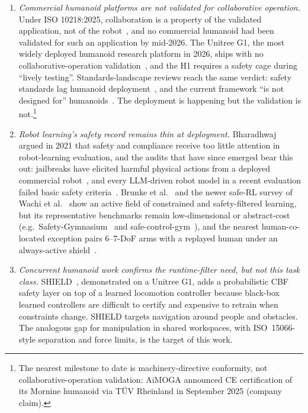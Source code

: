 \documentclass[11pt,a4paper]{report}
\newcommand{\iso}{ISO~15066}
\begin{document}
\begin{enumerate}[topsep=2pt,itemsep=2pt]
\item \emph{Commercial humanoid platforms are not validated for
  collaborative operation.} Under ISO 10218:2025, collaboration is a
  property of the validated application, not of the
  robot~\cite{hartmann2026iso}, and no commercial humanoid had been
  validated for such an application by mid-2026. The Unitree G1, the
  most widely deployed humanoid research platform in 2026, ships
  with no collaborative-operation validation~\cite{unitree_g1}, and
  the H1 requires a safety cage during ``lively testing''.
  Standards-landscape reviews reach the same verdict: safety
  standards lag humanoid deployment~\cite{koczi2025humanoidsafety},
  and the current framework ``is not designed for''
  humanoids~\cite{ieee2025pathway}. The deployment is happening but
  the validation is not.\footnote{The nearest milestone to date is
  machinery-directive conformity, not collaborative-operation
  validation: AiMOGA announced CE certification of its Mornine
  humanoid via T\"UV Rheinland in September 2025 (company claim).}
\item \emph{Robot learning's safety record remains thin at deployment.}
  Bharadhwaj~\cite{auditing2021} argued in 2021 that safety and
  compliance receive too little attention in robot-learning
  evaluation, and the audits that have since emerged bear this out:
  jailbreaks have elicited harmful physical actions from a deployed
  commercial robot~\cite{robey2025jailbreaking}, and every
  LLM-driven robot model in a recent evaluation failed basic safety
  criteria~\cite{hundt2025llmrobots}. Brunke et
  al.~\cite{brunke2022safelearning} and the newer safe-RL survey of
  Wachi et al.~\cite{wachi2024constraint} show an active field of
  constrained and safety-filtered learning, but its representative
  benchmarks remain low-dimensional or abstract-cost
  (e.g.\ Safety-Gymnasium~\cite{ji2023safetygymnasium} and
  safe-control-gym~\cite{yuan2022safecontrolgym}), and the nearest
  human-co-located exception pairs 6--7-DoF arms with a replayed
  human under an always-active shield~\cite{thumm2024humanrobotgym}.
\item \emph{Concurrent humanoid work confirms the runtime-filter need,
  but not this task class.} SHIELD~\cite{shield2025}, demonstrated on
  a Unitree G1, adds a probabilistic CBF safety layer on top of a
  learned locomotion controller because black-box learned controllers
  are difficult to certify and expensive to retrain when constraints
  change. SHIELD targets navigation around people and obstacles. The
  analogous gap for manipulation in shared workspaces, with
  \iso{}-style separation and force limits, is the target of this work.
\end{enumerate}
\end{document}
